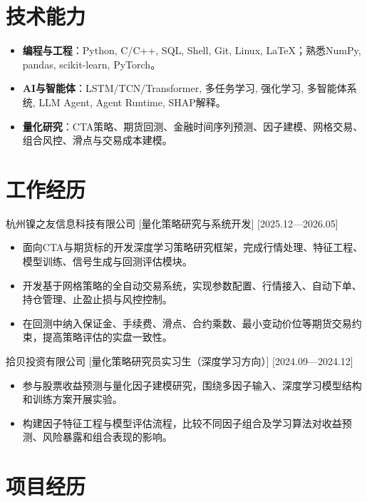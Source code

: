 \documentclass{resume}
\begin{document}
\section{\textbf{技术能力}}

\begin{itemize}
  \item \textbf{编程与工程}：Python, C/C++, SQL, Shell, Git, Linux, LaTeX；熟悉NumPy, pandas, scikit-learn, PyTorch。
  \item \textbf{AI与智能体}：LSTM/TCN/Transformer, 多任务学习, 强化学习, 多智能体系统, LLM Agent, Agent Runtime, SHAP解释。
  \item \textbf{量化研究}：CTA策略、期货回测、金融时间序列预测、因子建模、网格交易、组合风控、滑点与交易成本建模。
\end{itemize}


\section{\textbf{工作经历}}

\ResumeItem
{杭州镍之友信息科技有限公司}
[量化策略研究与系统开发]
[2025.12—2026.05]
\begin{itemize}
  \item 面向CTA与期货标的开发深度学习策略研究框架，完成行情处理、特征工程、模型训练、信号生成与回测评估模块。
  \item 开发基于网格策略的全自动交易系统，实现参数配置、行情接入、自动下单、持仓管理、止盈止损与风控控制。
  \item 在回测中纳入保证金、手续费、滑点、合约乘数、最小变动价位等期货交易约束，提高策略评估的实盘一致性。
\end{itemize}

\ResumeItem
{拾贝投资有限公司}
[量化策略研究员实习生（深度学习方向）]
[2024.09—2024.12]
\begin{itemize}
  \item 参与股票收益预测与量化因子建模研究，围绕多因子输入、深度学习模型结构和训练方案开展实验。
  \item 构建因子特征工程与模型评估流程，比较不同因子组合及学习算法对收益预测、风险暴露和组合表现的影响。
\end{itemize}


\section{\textbf{项目经历}}
\end{document}
